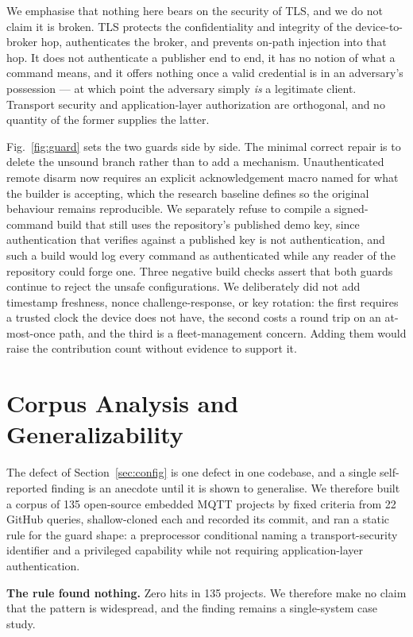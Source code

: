 We emphasise that nothing here bears on the security of TLS, and we do not claim it is broken.
TLS protects the confidentiality and integrity of the device-to-broker hop, authenticates the
broker, and prevents on-path injection into that hop. It does not authenticate a publisher end
to end, it has no notion of what a command means, and it offers nothing once a valid credential
is in an adversary's possession --- at which point the adversary simply \emph{is} a legitimate
client. Transport security and application-layer authorization are orthogonal, and no quantity
of the former supplies the latter.

Fig.~\ref{fig:guard} sets the two guards side by side. The minimal correct repair is to delete
the unsound branch rather than to add a mechanism.
Unauthenticated remote disarm now requires an explicit acknowledgement macro named for what the
builder is accepting, which the research baseline defines so the original behaviour remains
reproducible. We separately refuse to compile a signed-command build that still uses the
repository's published demo key, since authentication that verifies against a published key is
not authentication, and such a build would log every command as authenticated while any reader
of the repository could forge one. Three negative build checks assert that both guards continue
to reject the unsafe configurations. We deliberately did not add timestamp freshness, nonce
challenge-response, or key rotation: the first requires a trusted clock the device does not
have, the second costs a round trip on an at-most-once path, and the third is a fleet-management
concern. Adding them would raise the contribution count without evidence to support it.

\section{Corpus Analysis and Generalizability}
\label{sec:corpus}

The defect of Section~\ref{sec:config} is one defect in one codebase, and a single
self-reported finding is an anecdote until it is shown to generalise. We therefore built a
corpus of 135 open-source embedded MQTT projects by fixed criteria from 22 GitHub queries,
shallow-cloned each and recorded its commit, and ran a static rule for the guard shape: a
preprocessor conditional naming a transport-security identifier and a privileged capability
while not requiring application-layer authentication.

\textbf{The rule found nothing.} Zero hits in 135 projects. We therefore make no claim that the
pattern is widespread, and the finding remains a single-system case study.

